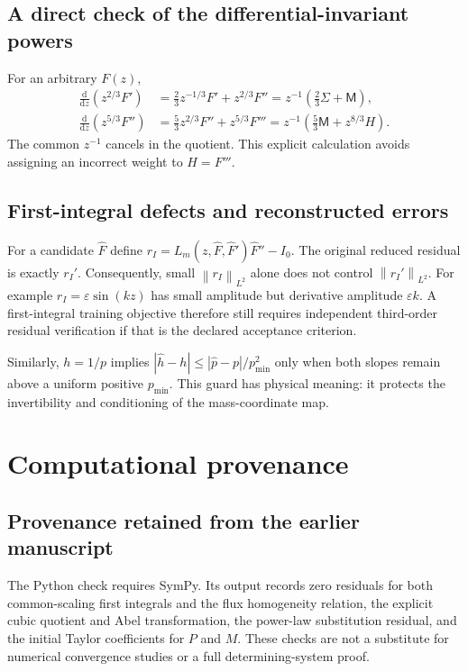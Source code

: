 \documentclass[11pt,a4paper,oneside]{report}
\numberwithin{equation}{chapter}
\newcommand{\dd}{\mathrm d}
\newcommand{\norm}[1]{\left\lVert#1\right\rVert}
\begin{document}
\section{A direct check of the differential-invariant powers}
For an arbitrary $F(z)$,
\begin{align}
\frac{\dd}{\dd z}(z^{2/3}F')
 &=\tfrac23z^{-1/3}F'+z^{2/3}F''
 =z^{-1}(\tfrac23\Sigma+\mathsf M),\\
\frac{\dd}{\dd z}(z^{5/3}F'')
 &=\tfrac53z^{2/3}F''+z^{5/3}F'''
 =z^{-1}(\tfrac53\mathsf M+z^{8/3}H).
\end{align}
The common $z^{-1}$ cancels in the quotient. This explicit calculation avoids assigning an incorrect weight to $H=F'''$.

\section{First-integral defects and reconstructed errors}
For a candidate $\widehat F$ define $r_I=L_m(z,\widehat F,\widehat F')\widehat F''-I_0$. The original reduced residual is exactly $r_I'$. Consequently, small $\norm{r_I}_{L^2}$ alone does not control $\norm{r_I'}_{L^2}$. For example $r_I=\varepsilon\sin(kz)$ has small amplitude but derivative amplitude $\varepsilon k$. A first-integral training objective therefore still requires independent third-order residual verification if that is the declared acceptance criterion.

Similarly, $h=1/p$ implies
$|\widehat h-h|\le|\widehat p-p|/p_{\min}^2$ only when both slopes remain above a uniform positive $p_{\min}$. This guard has physical meaning: it protects the invertibility and conditioning of the mass-coordinate map.

\chapter{Computational provenance}\label{app:repro}
\section{Provenance retained from the earlier manuscript}

The Python check requires SymPy. Its output records zero residuals for both common-scaling first integrals and the flux homogeneity relation, the explicit cubic quotient and Abel transformation, the power-law substitution residual, and the initial Taylor coefficients for $P$ and $M$. These checks are not a substitute for numerical convergence studies or a full determining-system proof.
\end{document}
